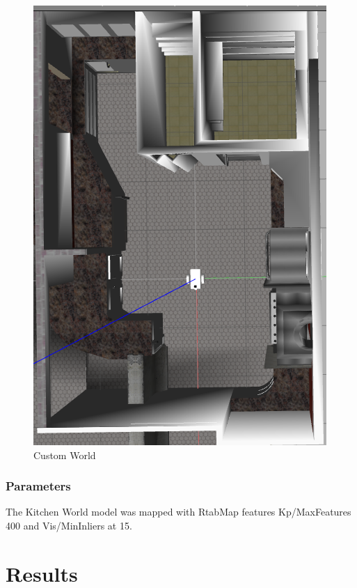 \documentclass[10pt,journal,compsoc]{IEEEtran}
\begin{document}
\begin{figure}[thpb]
      \centering
      \includegraphics[width=\linewidth]{images/cafekitchen}
      \caption{Custom World}
      \label{fig:customworld}
\end{figure}

\subsubsection{Parameters}
The Kitchen World model was mapped with RtabMap features Kp/MaxFeatures 400 and Vis/MinInliers at 15.




\section{Results}
\end{document}
